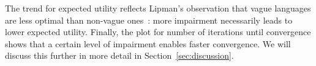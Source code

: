 The trend for expected utility reflects Lipman's observation that vague languages are less optimal than non-vague ones~\cite{Lipman2009:Why-is-Language}: more impairment necessarily leads to lower expected utility.
Finally, the plot for number of iterations until convergence shows that a certain level of impairment enables faster convergence.
We will discuss this further in more detail in Section~\ref{sec:discussion}.






